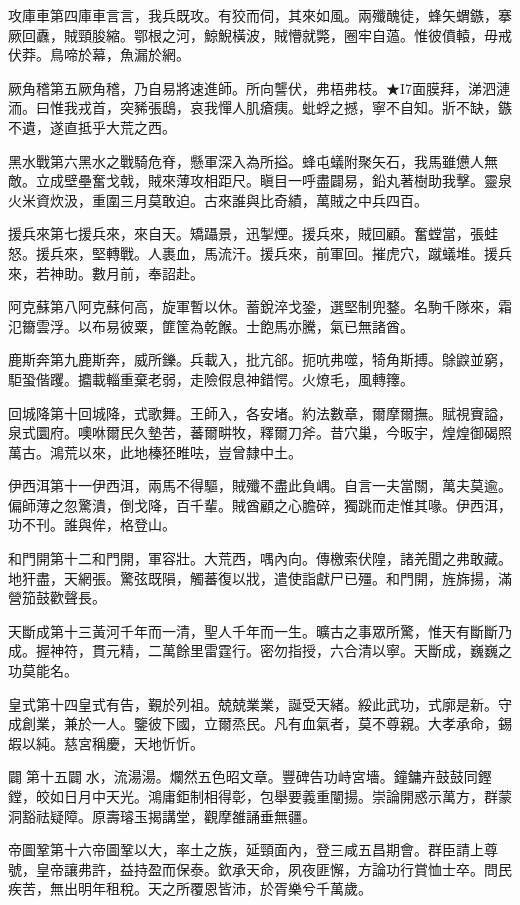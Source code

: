 \begin{pinyinscope}
攻庫車第四庫車言言，我兵既攻。有狡而伺，其來如風。兩殲醜徒，蜂矢蝟鏃，搴厥回纛，賊頸朘縮。鄂根之河，鯨鯢橫波，賊懵就斃，圈牢自薖。惟彼僨轅，毋戒伏莽。鳥啼於幕，魚漏於網。

厥角稽第五厥角稽，乃自易將速進師。所向讋伏，弗梧弗枝。★I7面膜拜，涕泗漣洏。曰惟我戎首，突豨張鴟，哀我憚人肌瘡痍。蚍蜉之撼，寧不自知。斨不缺，鏃不遺，遂直抵乎大荒之西。

黑水戰第六黑水之戰騎危脊，懸軍深入為所搤。蜂屯蟻附聚矢石，我馬雖憊人無敵。立成壁壘奮戈戟，賊來薄攻相距尺。瞋目一呼盡闢易，鉛丸著樹助我擊。靈泉火米資炊汲，重圍三月莫敢迫。古來誰與比奇績，萬賊之中兵四百。

援兵來第七援兵來，來自天。矯躡景，迅掣煙。援兵來，賊回顧。奮螳當，張蛙怒。援兵來，堅轉戰。人裹血，馬流汗。援兵來，前軍回。摧虎穴，蹴蟻堆。援兵來，若神助。數月前，奉詔赴。

阿克蘇第八阿克蘇何高，旋軍暫以休。蓄銳淬戈銎，選堅制兜鍪。名駒千隊來，霜氾籋雲浮。以布易彼粟，篚筐為乾餱。士飽馬亦騰，氣已無諸酋。

鹿斯奔第九鹿斯奔，威所鑠。兵載入，批亢郤。扼吭弗噬，犄角斯搏。鵌鼵並窮，駏蛩偕躩。攟載輜重棄老弱，走險假息神錯愕。火燎毛，風轉籜。

回城降第十回城降，式歌舞。王師入，各安堵。約法數章，爾摩爾撫。賦視賨謚，泉式圜府。噢咻爾民久墊苦，蕃爾畊牧，釋爾刀斧。昔穴巢，今昄宇，煌煌御碣照萬古。鴻荒以來，此地榛狉睢呿，豈曾隸中土。

伊西洱第十一伊西洱，兩馬不得驅，賊殲不盡此負嵎。自言一夫當關，萬夫莫逾。偏師薄之忽驚潰，倒戈降，百千輩。賊酋顧之心膽碎，獨跳而走惟其喙。伊西洱，功不刊。誰與侔，格登山。

和門開第十二和門開，軍容壯。大荒西，喁內向。傳檄索伏隍，諸羌聞之弗敢藏。地犴盡，天網張。驚弦既隕，觸蕃復以戕，遣使詣獻尸已殭。和門開，旌旆揚，滿營笳鼓歡聲長。

天斷成第十三黃河千年而一清，聖人千年而一生。曠古之事眾所驚，惟天有斷斷乃成。握神符，貫元精，二萬餘里雷霆行。密勿指授，六合清以寧。天斷成，巍巍之功莫能名。

皇式第十四皇式有告，覲於列祖。兢兢業業，誕受天緒。綏此武功，式廓是新。守成創業，兼於一人。鑒彼下國，立爾烝民。凡有血氣者，莫不尊親。大孝承命，錫嘏以純。慈宮稱慶，天地忻忻。

闢第十五闢水，流湯湯。爛然五色昭文章。豐碑告功峙宮墻。鐘鏞卉鼓鼓同鏗鏜，皎如日月中天光。鴻庸鉅制相得彰，包舉要義重闡揚。崇論開惑示萬方，群蒙洞豁祛疑障。原壽璿玉揭講堂，觀摩雒誦垂無疆。

帝圖鞏第十六帝圖鞏以大，率土之族，延頸面內，登三咸五昌期會。群臣請上尊號，皇帝讓弗許，益持盈而保泰。欽承天命，夙夜匪懈，方論功行賞恤士卒。問民疾苦，無出明年租稅。天之所覆恩皆沛，於胥樂兮千萬歲。


\end{pinyinscope}
